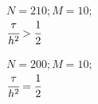 \documentclass[12pt]{extarticle}
\numberwithin{equation}{section}
\begin{document}
\begin{figure}[H]
\begin{minipage}[h]{0.43\linewidth}
 $N=210; M=10;$\\$ \cfrac{\tau}{h^2} > \cfrac{1}{2}$
\end{minipage}
\hfill
\begin{minipage}[h]{0.43\linewidth}
 $N=200; M=10;$\\$ \cfrac{\tau}{h^2} = \cfrac{1}{2}$
\end{minipage}
\end{figure}
\end{document}

